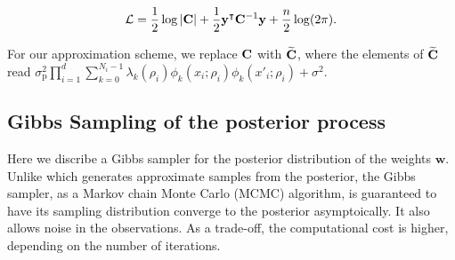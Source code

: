\documentclass{article}
\begin{document}
\begin{equation}\label{}
	\mathcal{L} = \frac{1}{2} \log |{\bf C}| + \frac{1}{2} {\bf y}^\intercal {\bf C}^{-1} {\bf y} +\frac{n}{2} \log(2 \pi). 
\end{equation}

For our approximation scheme, we replace ${\bf C}$ with $\widetilde{\bf C}$, where the elements of $\widetilde{\bf C}$ read $\sigma^2_\text{p} \prod_{i=1}^{d} \sum_{k=0}^{N_i-1} \lambda_k (\rho_i) \phi_k(x_i;\rho_i) \phi_k(x'_i;\rho_i) + \sigma^2$.

%


\subsection{Gibbs Sampling of the posterior process}
\label{sec:Gibbs}

Here we discribe a Gibbs sampler for the posterior distribution of the weights $\mathbf{w}$.
Unlike  which generates approximate samples from the posterior,
the Gibbs sampler, as a Markov chain Monte Carlo (MCMC) algorithm,
is guaranteed to have its sampling distribution converge to the posterior asymptoically.
It also allows noise in the observations.
As a trade-off, the computational cost is higher, depending on the number of iterations.
\end{document}
